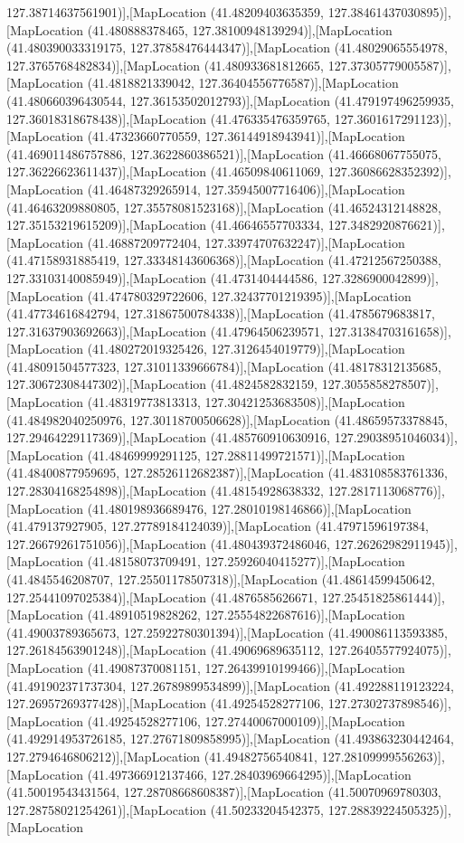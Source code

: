 127.38714637561901)],[MapLocation (41.48209403635359, 127.38461437030895)],[MapLocation (41.480888378465, 127.38100948139294)],[MapLocation (41.480390033319175, 127.37858476444347)],[MapLocation (41.48029065554978, 127.3765768482834)],[MapLocation (41.480933681812665, 127.37305779005587)],[MapLocation (41.4818821339042, 127.36404556776587)],[MapLocation (41.480660396430544, 127.36153502012793)],[MapLocation (41.479197496259935, 127.36018318678438)],[MapLocation (41.476335476359765, 127.3601617291123)],[MapLocation (41.47323660770559, 127.36144918943941)],[MapLocation (41.469011486757886, 127.3622860386521)],[MapLocation (41.46668067755075, 127.36226623611437)],[MapLocation (41.46509840611069, 127.36086628352392)],[MapLocation (41.46487329265914, 127.35945007716406)],[MapLocation (41.46463209880805, 127.35578081523168)],[MapLocation (41.46524312148828, 127.35153219615209)],[MapLocation (41.46646557703334, 127.3482920876621)],[MapLocation (41.46887209772404, 127.33974707632247)],[MapLocation (41.47158931885419, 127.33348143606368)],[MapLocation (41.47212567250388, 127.33103140085949)],[MapLocation (41.4731404444586, 127.3286900042899)],[MapLocation (41.474780329722606, 127.32437701219395)],[MapLocation (41.47734616842794, 127.31867500784338)],[MapLocation (41.4785679683817, 127.31637903692663)],[MapLocation (41.47964506239571, 127.31384703161658)],[MapLocation (41.480272019325426, 127.3126454019779)],[MapLocation (41.48091504577323, 127.31011339666784)],[MapLocation (41.48178312135685, 127.30672308447302)],[MapLocation (41.4824582832159, 127.3055858278507)],[MapLocation (41.48319773813313, 127.30421253683508)],[MapLocation (41.484982040250976, 127.30118700506628)],[MapLocation (41.48659573378845, 127.29464229117369)],[MapLocation (41.485760910630916, 127.29038951046034)],[MapLocation (41.48469999291125, 127.28811499721571)],[MapLocation (41.48400877959695, 127.28526112682387)],[MapLocation (41.483108583761336, 127.28304168254898)],[MapLocation (41.48154928638332, 127.2817113068776)],[MapLocation (41.480198936689476, 127.28010198146866)],[MapLocation (41.479137927905, 127.27789184124039)],[MapLocation (41.47971596197384, 127.26679261751056)],[MapLocation (41.480439372486046, 127.26262982911945)],[MapLocation (41.48158073709491, 127.25926040415277)],[MapLocation (41.4845546208707, 127.25501178507318)],[MapLocation (41.48614599450642, 127.25441097025384)],[MapLocation (41.4876585626671, 127.25451825861444)],[MapLocation (41.48910519828262, 127.25554822687616)],[MapLocation (41.49003789365673, 127.25922780301394)],[MapLocation (41.490086113593385, 127.26184563901248)],[MapLocation (41.49069689635112, 127.26405577924075)],[MapLocation (41.49087370081151, 127.26439910199466)],[MapLocation (41.491902371737304, 127.26789899534899)],[MapLocation (41.492288119123224, 127.26957269377428)],[MapLocation (41.49254528277106, 127.27302737898546)],[MapLocation (41.49254528277106, 127.27440067000109)],[MapLocation (41.492914953726185, 127.27671809858995)],[MapLocation (41.493863230442464, 127.2794646806212)],[MapLocation (41.49482756540841, 127.28109999556263)],[MapLocation (41.497366912137466, 127.28403969664295)],[MapLocation (41.50019543431564, 127.28708668608387)],[MapLocation (41.50070969780303, 127.28758021254261)],[MapLocation (41.50233204542375, 127.28839224505325)],[MapLocation 